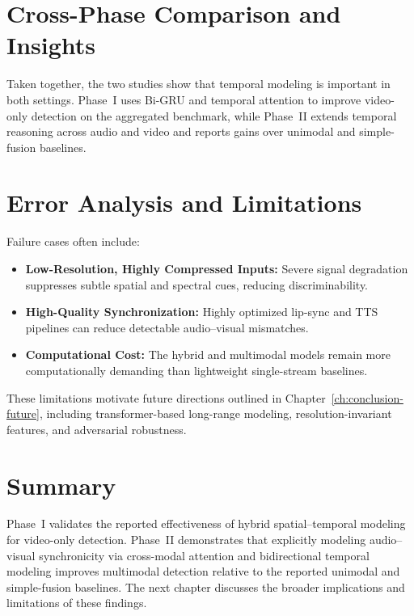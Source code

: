 \section{Cross-Phase Comparison and Insights}
Taken together, the two studies show that temporal modeling is important in both settings. Phase~I uses Bi-GRU and temporal attention to improve video-only detection on the aggregated benchmark, while Phase~II extends temporal reasoning across audio and video and reports gains over unimodal and simple-fusion baselines.

\section{Error Analysis and Limitations}
Failure cases often include:
\begin{itemize}
    \item \textbf{Low-Resolution, Highly Compressed Inputs:} Severe signal degradation suppresses subtle spatial and spectral cues, reducing discriminability.
    \item \textbf{High-Quality Synchronization:} Highly optimized lip-sync and TTS pipelines can reduce detectable audio–visual mismatches.
    \item \textbf{Computational Cost:} The hybrid and multimodal models remain more computationally demanding than lightweight single-stream baselines.
\end{itemize}
These limitations motivate future directions outlined in Chapter~\ref{ch:conclusion-future}, including transformer-based long-range modeling, resolution-invariant features, and adversarial robustness.

\section{Summary}
Phase~I validates the reported effectiveness of hybrid spatial–temporal modeling for video-only detection. Phase~II demonstrates that explicitly modeling audio–visual synchronicity via cross-modal attention and bidirectional temporal modeling improves multimodal detection relative to the reported unimodal and simple-fusion baselines. The next chapter discusses the broader implications and limitations of these findings.